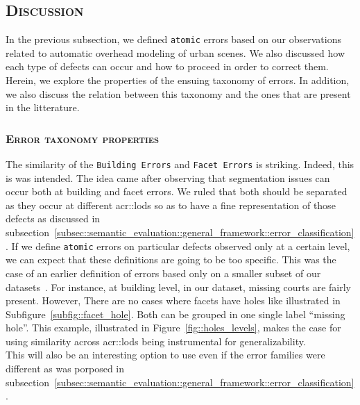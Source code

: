     \subsection{\textsc{Discussion}}
        \label{subsec::semantic_evaluation::overhead::discussion}

        In the previous subsection, we defined \texttt{atomic} errors based on our observations related to automatic overhead modeling of urban scenes.
        We also discussed how each type of defects can occur and how to proceed in order to correct them.
        Herein, we explore the properties of the ensuing taxonomy of errors.
        In addition, we also discuss the relation between this taxonomy and the ones that are present in the litterature.

        \subsubsection{\textsc{Error taxonomy properties}}
            The similarity of the \texttt{Building Errors} and \texttt{Facet Errors} is striking.
            Indeed, this is was intended.
            The idea came after observing that segmentation issues can occur both at building and facet errors.
            We ruled that both should be separated as they occur at different \glspl{acr::lod} so as to have a fine representation of those defects as discussed in subsection~\ref{subsec::semantic_evaluation::general_framework::error_classification}.
            If we define \texttt{atomic} errors on particular defects observed only at a certain level, we can expect that these definitions are going to be too specific.
            This was the case of an earlier definition of errors based only on a smaller subset of our datasets~\parencite{ennafii2018semantic}.
            For instance, at building level, in our dataset, missing courts are fairly present.
            However, There are no cases where facets have holes like illustrated in Subfigure~\ref{subfig::facet_hole}.
            Both can be grouped in one single label ``missing hole''.
            This example, illustrated in Figure~\ref{fig::holes_levels}, makes the case for using similarity across \glspl{acr::lod} being instrumental for generalizability.\\
            This will also be an interesting option to use even if the error families were different as was porposed in subsection~\ref{subsec::semantic_evaluation::general_framework::error_classification}.\\

